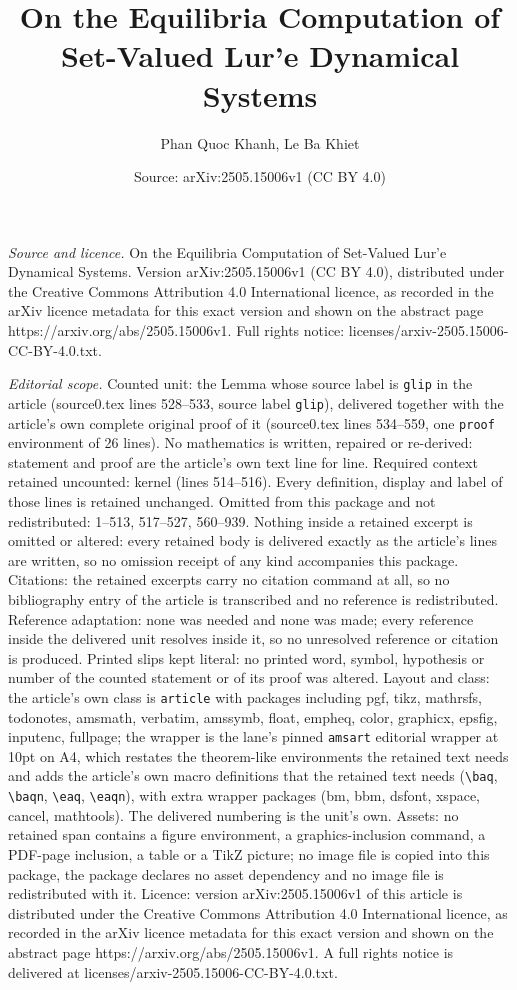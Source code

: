 \documentclass[10pt,a4paper]{amsart}
\title[On the Equilibria Computation of Set-Valued Lur'e Dynamical ]{On the Equilibria Computation of Set-Valued Lur'e Dynamical Systems}
\author{Phan Quoc Khanh, Le Ba Khiet}
\date{Source: arXiv:2505.15006v1 (CC BY 4.0)}
\begin{document}
\maketitle

\noindent\emph{Source and licence.} On the Equilibria Computation of Set-Valued Lur'e Dynamical Systems. Version arXiv:2505.15006v1 (CC BY 4.0), distributed under the Creative Commons Attribution 4.0 International licence, as recorded in the arXiv licence metadata for this exact version and shown on the abstract page https://arxiv.org/abs/2505.15006v1. Full rights notice: licenses/arxiv-2505.15006-CC-BY-4.0.txt.\par\smallskip

\noindent\textit{Editorial scope.} Counted unit: the Lemma whose source label is \texttt{glip} in the article (source0.tex lines 528--533, source label \texttt{glip}), delivered together with the article's own complete original proof of it (source0.tex lines 534--559, one \texttt{proof} environment of 26 lines). No mathematics is written, repaired or re-derived: statement and proof are the article's own text line for line. Required context retained uncounted: kernel (lines 514--516). Every definition, display and label of those lines is retained unchanged. Omitted from this package and not redistributed: 1--513, 517--527, 560--939. Nothing inside a retained excerpt is omitted or altered: every retained body is delivered exactly as the article's lines are written, so no omission receipt of any kind accompanies this package. Citations: the retained excerpts carry no citation command at all, so no bibliography entry of the article is transcribed and no reference is redistributed. Reference adaptation: none was needed and none was made; every reference inside the delivered unit resolves inside it, so no unresolved reference or citation is produced. Printed slips kept literal: no printed word, symbol, hypothesis or number of the counted statement or of its proof was altered. Layout and class: the article's own class is \texttt{article} with packages including pgf, tikz, mathrsfs, todonotes, amsmath, verbatim, amssymb, float, empheq, color, graphicx, epsfig, inputenc, fullpage; the wrapper is the lane's pinned \texttt{amsart} editorial wrapper at 10pt on A4, which restates the theorem-like environments the retained text needs and adds the article's own macro definitions that the retained text needs (\texttt{\textbackslash baq}, \texttt{\textbackslash baqn}, \texttt{\textbackslash eaq}, \texttt{\textbackslash eaqn}), with extra wrapper packages (bm, bbm, dsfont, xspace, cancel, mathtools). The delivered numbering is the unit's own. Assets: no retained span contains a figure environment, a graphics-inclusion command, a PDF-page inclusion, a table or a TikZ picture; no image file is copied into this package, the package declares no asset dependency and no image file is redistributed with it. Licence: version arXiv:2505.15006v1 of this article is distributed under the Creative Commons Attribution 4.0 International licence, as recorded in the arXiv licence metadata for this exact version and shown on the abstract page https://arxiv.org/abs/2505.15006v1. A full rights notice is delivered at licenses/arxiv-2505.15006-CC-BY-4.0.txt. 
\end{document}
